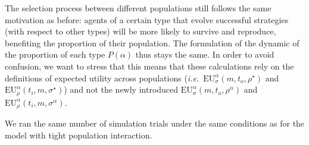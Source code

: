 \documentclass[a4paper]{article}
\begin{document}
The selection process between different populations still follows the same motivation as before: agents of a certain type that evolve successful strategies (with respect to other types) will be more likely to survive and reproduce, benefiting the proportion of their population.
The formulation of the dynamic of the proportion of each type $P(\alpha)$ thus stays the same.
In order to avoid confusion, we want to stress that this means that these calculations rely on the definitions of expected utility across populations (\emph{i.e.}~$\text{EU}_{\sigma}^{\alpha}(m,t_{o},\rho^{\star})$ and $\text{EU}_{\rho}^{\alpha}(t_{i},m,\sigma^{\star})$) and not the newly introduced $\text{EU}_{\sigma}^{\alpha}(m,t_{o},\rho^{\alpha})$ and $\text{EU}_{\rho}^{\alpha}(t_{i},m,\sigma^{\alpha})$.

We ran the same number of simulation trials under the same conditions as for the model with tight population interaction.
\end{document}
